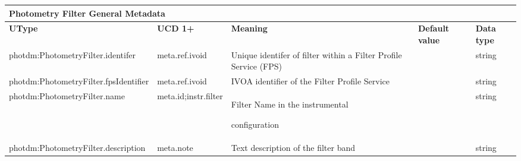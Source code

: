 \documentclass[11pt,a4paper]{ivoa}
\begin{document}
\begin{appendices}
\newpage
\begin{table}[H]
\centering
\begin{adjustbox}{angle=90}
\begin{tabular}{p{2.5in}|p{1.5in}|p{2in}|p{0.74in}|p{0.35in}}
\multicolumn{5}{p{\dimexpr6.59in+8\tabcolsep\relax}}{\centering
{\fontsize{8pt}{8pt}\selectfont \textbf{Photometry Filter General Metadata}}} \\
\hline
\multicolumn{1}{p{2.5in}}{{\fontsize{8pt}{8pt}\selectfont \textbf{UType}}} &
\multicolumn{1}{p{1.5in}}{{\fontsize{8pt}{8pt}\selectfont \textbf{UCD 1+}}} &
\multicolumn{1}{p{2in}}{{\fontsize{8pt}{8pt}\selectfont \textbf{Meaning}}} &
\multicolumn{1}{p{0.74in}}{{\fontsize{8pt}{8pt}\selectfont \textbf{Default value}}} &
\multicolumn{1}{p{0.35in}}{{\fontsize{8pt}{8pt}\selectfont \textbf{Data type}}} \\
\hline
\multicolumn{1}{p{2.5in}}{{\fontsize{8pt}{8pt}\selectfont photdm:PhotometryFilter.identifer}} &
\multicolumn{1}{p{1.5in}}{{\fontsize{8pt}{8pt}\selectfont meta.ref.ivoid }} &
\multicolumn{1}{p{2in}}{{\fontsize{8pt}{8pt}\selectfont Unique identifer of
filter within a Filter Profile Service (FPS)}} &
\multicolumn{1}{p{0.74in}}{} &
\multicolumn{1}{p{0.35in}}{{\fontsize{8pt}{8pt}\selectfont string}} \\
\hline
\multicolumn{1}{p{2.5in}}{{\fontsize{8pt}{8pt}\selectfont photdm:PhotometryFilter.fpsIdentifier}} &
\multicolumn{1}{p{1.5in}}{{\fontsize{8pt}{8pt}\selectfont meta.ref.ivoid }} &
\multicolumn{1}{p{2in}}{{\fontsize{8pt}{8pt}\selectfont IVOA identifier of the
Filter Profile Service}} &
\multicolumn{1}{p{0.74in}}{} &
\multicolumn{1}{p{0.35in}}{{\fontsize{8pt}{8pt}\selectfont string}} \\
\hline
\multicolumn{1}{p{2.5in}}{{\fontsize{8pt}{8pt}\selectfont photdm:PhotometryFilter.name}} &
\multicolumn{1}{p{1.5in}}{{\fontsize{8pt}{8pt}\selectfont meta.id;instr.filter }} &
\multicolumn{1}{p{2in}}{{\fontsize{8pt}{8pt}\selectfont Filter Name in the instrumental }
\par {\fontsize{10pt}{12.0pt}\selectfont configuration\  }} &
\multicolumn{1}{p{0.74in}}{} &
\multicolumn{1}{p{0.35in}}{{\fontsize{8pt}{8pt}\selectfont string}} \\
\hline
\multicolumn{1}{p{2.5in}}{{\fontsize{8pt}{8pt}\selectfont photdm:PhotometryFilter.description}} &
\multicolumn{1}{p{1.5in}}{{\fontsize{8pt}{8pt}\selectfont meta.note }} &
\multicolumn{1}{p{2in}}{{\fontsize{8pt}{8pt}\selectfont Text description of the filter band}} &
\multicolumn{1}{p{0.74in}}{} &
\multicolumn{1}{p{0.35in}}{{\fontsize{8pt}{8pt}\selectfont string}} \\
\hline
\end{tabular}
\end{adjustbox}
 \end{table}



\end{appendices}
\end{document}

